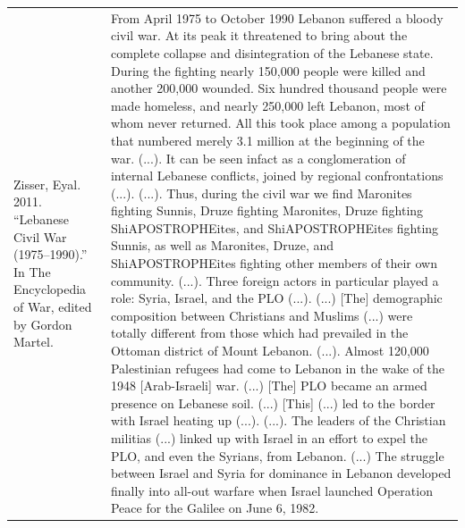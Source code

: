 {\begin{longtable}{p{}p{}}
\\
Zisser, Eyal. 2011. “Lebanese Civil War (1975–1990).” In The Encyclopedia of War, edited by Gordon Martel. & From April 1975 to October 1990 Lebanon suffered a bloody civil war. At its peak it threatened to bring about the complete collapse and disintegration of the Lebanese state. During the fighting nearly 150,000 people were killed and another 200,000 wounded. Six hundred thousand people were made homeless, and nearly 250,000 left Lebanon, most of whom never returned. All this took place among a population that numbered merely 3.1 million at the beginning of the war. (...). It can be seen infact as a conglomeration of internal Lebanese conflicts, joined by regional confrontations (...). (...). Thus, during the civil war we find Maronites fighting Sunnis, Druze fighting Maronites, Druze fighting ShiAPOSTROPHEites, and ShiAPOSTROPHEites fighting Sunnis, as well as Maronites, Druze, and ShiAPOSTROPHEites fighting other members of their own community. (...). Three foreign actors in particular played a role: Syria, Israel, and the PLO (...). (...) [The] demographic composition between Christians and Muslims (...) were totally different from those which had prevailed in the Ottoman district of Mount Lebanon. (...). Almost 120,000 Palestinian refugees had come to Lebanon in the wake of the 1948 [Arab-Israeli] war. (...) [The] PLO became an armed presence on Lebanese soil. (...) [This] (...) led to the border with Israel heating up (...). (...). The leaders of the Christian militias (...) linked up with Israel in an effort to expel the PLO, and even the Syrians, from Lebanon. (...) The struggle between Israel and Syria for dominance in Lebanon developed finally into all-out warfare when Israel launched Operation Peace for the Galilee on June 6, 1982.
\\

\end{longtable}}
